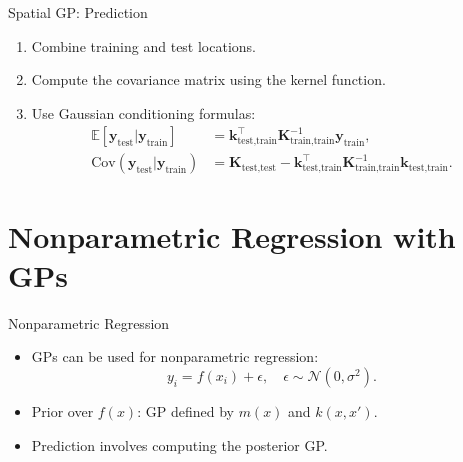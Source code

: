 \documentclass[11pt,handout,aspectratio=169]{beamer}
\begin{document}
\begin{frame}{Spatial GP: Prediction}
\begin{enumerate}
    \item Combine training and test locations.
    \item Compute the covariance matrix using the kernel function.
    \item Use Gaussian conditioning formulas:
    \begin{align*}
        \mathbb{E}[\mathbf{y}_\text{test} | \mathbf{y}_\text{train}] &= \mathbf{k}_\text{test,train}^\top \mathbf{K}_\text{train,train}^{-1} \mathbf{y}_\text{train}, \\
        \text{Cov}(\mathbf{y}_\text{test} | \mathbf{y}_\text{train}) &= \mathbf{K}_\text{test,test} - \mathbf{k}_\text{test,train}^\top \mathbf{K}_\text{train,train}^{-1} \mathbf{k}_\text{test,train}.
    \end{align*}
\end{enumerate}
\end{frame}

\section{Nonparametric Regression with GPs}

\begin{frame}{Nonparametric Regression}
\begin{itemize}
    \item GPs can be used for nonparametric regression:
    \[
    y_i = f(x_i) + \epsilon, \quad \epsilon \sim \mathcal{N}(0, \sigma^2).
    \]
    \item Prior over \( f(x) \): GP defined by \( m(x) \) and \( k(x, x') \).
    \item Prediction involves computing the posterior GP.
\end{itemize}
\end{frame}

%
%
%
%
\end{document}
